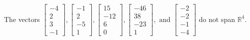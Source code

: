 \begin{exercise}
\begin{exerciseStatement}
  \end{exerciseStatement}
  \begin{exerciseAnswer}
   The vectors \(\left[\begin{array}{r}
-4 \\
2 \\
3 \\
-1
\end{array}\right] , \left[\begin{array}{r}
-1 \\
2 \\
-5 \\
1
\end{array}\right] , \left[\begin{array}{r}
15 \\
-12 \\
6 \\
0
\end{array}\right] , \left[\begin{array}{r}
-46 \\
38 \\
-23 \\
1
\end{array}\right] , \text{ and } \left[\begin{array}{r}
-2 \\
-2 \\
-1 \\
-4
\end{array}\right]\) 
  	 do not  
	span \(\mathbb{R}^4\).
  


  \end{exerciseAnswer}
\end{exercise}